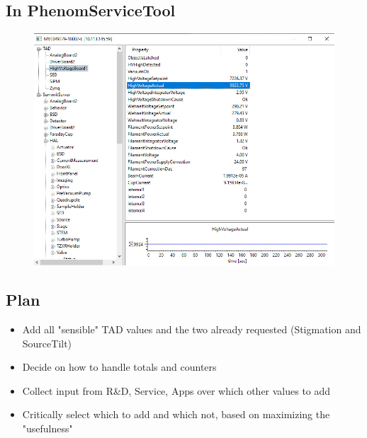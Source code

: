 \documentclass[t, 9pt, aspectratio=169]{beamer}
\begin{document}
    \subsection{In PhenomServiceTool}

    \begin{frame}{\secname}{\subsecname}
        \begin{figure}
            \hspace*{0.5cm}\includegraphics[scale=0.47]{tad-accessors-service-tool.jpg}
        \end{figure}
    \end{frame}

    \subsection{Plan}

    \begin{frame}{\secname}{\subsecname}
        \begin{itemize}
            \item Add all "sensible" TAD values and the two already requested (Stigmation and SourceTilt)
            \item Decide on how to handle totals and counters
            \item Collect input from R\&D, Service, Apps over which other values to add
            \item Critically select which to add and which not, based on maximizing the "usefulness"
        \end{itemize}
    \end{frame}
\end{document}
